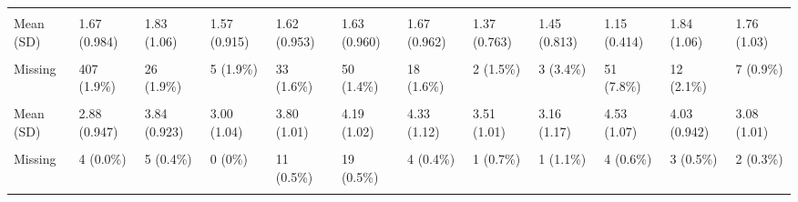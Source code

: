 \documentclass[
  single column]{article}
\begin{document}
\begin{landscape}
\begin{longtable}[t]{llllllllllll}
\cellcolor{gray!10}{rural\_gch\_2018\_l} & \cellcolor{gray!10}{} & \cellcolor{gray!10}{} & \cellcolor{gray!10}{} & \cellcolor{gray!10}{} & \cellcolor{gray!10}{} & \cellcolor{gray!10}{} & \cellcolor{gray!10}{} & \cellcolor{gray!10}{} & \cellcolor{gray!10}{} & \cellcolor{gray!10}{} & \cellcolor{gray!10}{}\\
Mean (SD) & 1.67 (0.984) & 1.83 (1.06) & 1.57 (0.915) & 1.62 (0.953) & 1.63 (0.960) & 1.67 (0.962) & 1.37 (0.763) & 1.45 (0.813) & 1.15 (0.414) & 1.84 (1.06) & 1.76 (1.03)\\
\cellcolor{gray!10}{Median [Min, Max]} & \cellcolor{gray!10}{1.00 [1.00, 5.00]} & \cellcolor{gray!10}{1.00 [1.00, 5.00]} & \cellcolor{gray!10}{1.00 [1.00, 5.00]} & \cellcolor{gray!10}{1.00 [1.00, 5.00]} & \cellcolor{gray!10}{1.00 [1.00, 5.00]} & \cellcolor{gray!10}{1.00 [1.00, 5.00]} & \cellcolor{gray!10}{1.00 [1.00, 4.00]} & \cellcolor{gray!10}{1.00 [1.00, 4.00]} & \cellcolor{gray!10}{1.00 [1.00, 4.00]} & \cellcolor{gray!10}{1.00 [1.00, 5.00]} & \cellcolor{gray!10}{1.00 [1.00, 5.00]}\\
Missing & 407 (1.9\%) & 26 (1.9\%) & 5 (1.9\%) & 33 (1.6\%) & 50 (1.4\%) & 18 (1.6\%) & 2 (1.5\%) & 3 (3.4\%) & 51 (7.8\%) & 12 (2.1\%) & 7 (0.9\%)\\
\addlinespace
\cellcolor{gray!10}{rwa} & \cellcolor{gray!10}{} & \cellcolor{gray!10}{} & \cellcolor{gray!10}{} & \cellcolor{gray!10}{} & \cellcolor{gray!10}{} & \cellcolor{gray!10}{} & \cellcolor{gray!10}{} & \cellcolor{gray!10}{} & \cellcolor{gray!10}{} & \cellcolor{gray!10}{} & \cellcolor{gray!10}{}\\
Mean (SD) & 2.88 (0.947) & 3.84 (0.923) & 3.00 (1.04) & 3.80 (1.01) & 4.19 (1.02) & 4.33 (1.12) & 3.51 (1.01) & 3.16 (1.17) & 4.53 (1.07) & 4.03 (0.942) & 3.08 (1.01)\\
\cellcolor{gray!10}{Median [Min, Max]} & \cellcolor{gray!10}{2.83 [1.00, 7.00]} & \cellcolor{gray!10}{3.83 [1.00, 7.00]} & \cellcolor{gray!10}{2.82 [1.00, 6.50]} & \cellcolor{gray!10}{3.83 [1.00, 7.00]} & \cellcolor{gray!10}{4.17 [1.00, 7.00]} & \cellcolor{gray!10}{4.33 [1.00, 7.00]} & \cellcolor{gray!10}{3.50 [1.60, 5.50]} & \cellcolor{gray!10}{3.10 [1.00, 6.00]} & \cellcolor{gray!10}{4.50 [1.00, 7.00]} & \cellcolor{gray!10}{4.00 [1.00, 7.00]} & \cellcolor{gray!10}{3.00 [1.00, 7.00]}\\
Missing & 4 (0.0\%) & 5 (0.4\%) & 0 (0\%) & 11 (0.5\%) & 19 (0.5\%) & 4 (0.4\%) & 1 (0.7\%) & 1 (1.1\%) & 4 (0.6\%) & 3 (0.5\%) & 2 (0.3\%)\\
\cellcolor{gray!10}{sample\_frame\_opt\_in\_binary} & \cellcolor{gray!10}{} & \cellcolor{gray!10}{} & \cellcolor{gray!10}{} & \cellcolor{gray!10}{} & \cellcolor{gray!10}{} & \cellcolor{gray!10}{} & \cellcolor{gray!10}{} & \cellcolor{gray!10}{} & \cellcolor{gray!10}{} & \cellcolor{gray!10}{} & \cellcolor{gray!10}{}\\

\end{longtable}
\end{landscape}
\end{document}
